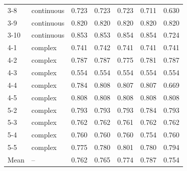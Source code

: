 \documentclass[a4paper,fleqn]{cas-dc}
\begin{document}
\begin{table}[t]
{\begin{tabular*}{\textwidth}{@{\extracolsep{\fill}} l l c cccc @{}}
3-8 & continuous & 0.723 & 0.723 & 0.723 & 0.711 & 0.630 \\
3-9 & continuous & 0.820 & 0.820 & 0.820 & 0.820 & 0.820 \\
\rowcolor{yellow!25}3-10 & continuous & 0.853 & 0.853 & 0.854 & 0.854 & 0.724 \\
\rowcolor{yellow!25}4-1 & complex & 0.741 & 0.742 & 0.741 & 0.741 & 0.741 \\
4-2 & complex & 0.787 & 0.787 & 0.775 & 0.781 & 0.787 \\
4-3 & complex & 0.554 & 0.554 & 0.554 & 0.554 & 0.554 \\
4-4 & complex & 0.784 & 0.808 & 0.807 & 0.807 & 0.669 \\
4-5 & complex & 0.808 & 0.808 & 0.808 & 0.808 & 0.808 \\
5-2 & complex & 0.793 & 0.793 & 0.793 & 0.784 & 0.793 \\
5-3 & complex & 0.762 & 0.762 & 0.761 & 0.762 & 0.762 \\
5-4 & complex & 0.760 & 0.760 & 0.760 & 0.754 & 0.760 \\
5-5 & complex & 0.775 & 0.780 & 0.801 & 0.780 & 0.794 \\
\midrule
\rowcolor{yellow!25}Mean & -- & 0.762 & 0.765 & 0.774 & 0.787 & 0.754 \\
\bottomrule
\end{tabular*}}
\end{table}
\end{document}
